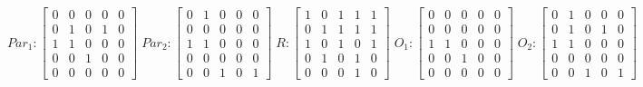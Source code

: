      $$
        Par_{1} : \begin{bmatrix}
            0 & 0 & 0 & 0 & 0 \\
            0 & 1 & 0 & 1 & 0 \\
            1 & 1 & 0 & 0 & 0 \\
			0 & 0 & 1 & 0 & 0 \\
            0 & 0 & 0 & 0 & 0 
        \end{bmatrix}
        \;
        Par_{2} : \begin{bmatrix}
            0 & 1 & 0 & 0 & 0 \\
            0 & 0 & 0 & 0 & 0 \\
            1 & 1 & 0 & 0 & 0 \\
            0 & 0 & 0 & 0 & 0 \\
            0 & 0 & 1 & 0 & 1
        \end{bmatrix}
        \;
        R : \begin{bmatrix}
            1 & 0 & 1 & 1 & 1 \\
            0 & 1 & 1 & 1 & 1 \\
            1 & 0 & 1 & 0 & 1 \\
            0 & 1 & 0 & 1 & 0 \\
            0 & 0 & 0 & 1 & 0
        \end{bmatrix}
        \;
        O_{1} : \begin{bmatrix}
            0 & 0 & 0 & 0 & 0 \\
            0 & 0 & 0 & 0 & 0 \\
            1 & 1 & 0 & 0 & 0 \\
            0 & 0 & 1 & 0 & 0 \\
            0 & 0 & 0 & 0 & 0
        \end{bmatrix}
        \;
        O_{2} : \begin{bmatrix}
            0 & 1 & 0 & 0 & 0 \\
            0 & 1 & 0 & 1 & 0 \\
            1 & 1 & 0 & 0 & 0 \\
            0 & 0 & 0 & 0 & 0 \\
            0 & 0 & 1 & 0 & 1
        \end{bmatrix}
    $$ 
